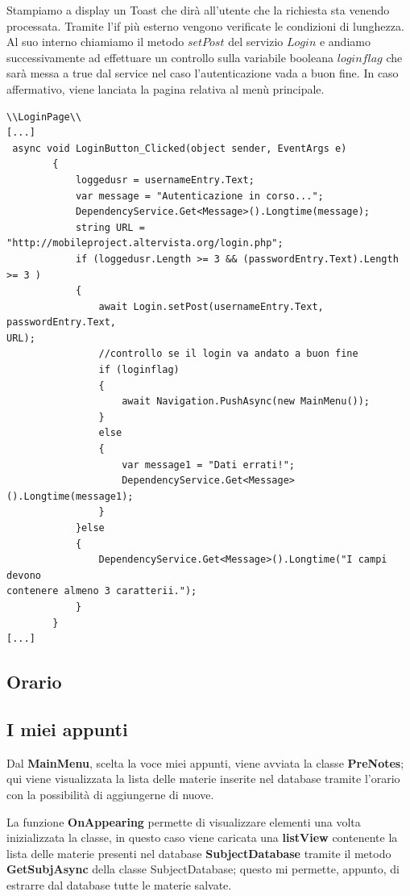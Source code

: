 \documentclass[a4paper, 50pt, twoside]{article}
\begin{document}
Stampiamo a display un Toast che dirà all'utente che la richiesta sta venendo processata. Tramite l'if più esterno vengono verificate le condizioni di lunghezza. Al suo interno chiamiamo il metodo $setPost$ del servizio $Login$ e andiamo successivamente ad effettuare un controllo sulla variabile booleana $loginflag$ che sarà messa a true dal service nel caso l'autenticazione vada a buon fine. In caso affermativo, viene lanciata la pagina relativa al menù principale.
\begin{lstlisting}
\\LoginPage\\
[...]
 async void LoginButton_Clicked(object sender, EventArgs e)
        {
            loggedusr = usernameEntry.Text;
            var message = "Autenticazione in corso...";
            DependencyService.Get<Message>().Longtime(message);
            string URL = "http://mobileproject.altervista.org/login.php";
            if (loggedusr.Length >= 3 && (passwordEntry.Text).Length >= 3 )
            {
                await Login.setPost(usernameEntry.Text, passwordEntry.Text, 
URL);
                //controllo se il login va andato a buon fine
                if (loginflag)
                {
                    await Navigation.PushAsync(new MainMenu());
                }
                else
                {
                    var message1 = "Dati errati!";
                    DependencyService.Get<Message>().Longtime(message1);
                }
            }else
            {
                DependencyService.Get<Message>().Longtime("I campi devono 
contenere almeno 3 caratterii.");
            }
        }
[...]
\end{lstlisting}
\subsection{Orario}
\subsection{I miei appunti}
Dal \textbf{MainMenu}, scelta la voce miei appunti, viene avviata la classe \textbf{PreNotes}; qui viene visualizzata la lista delle materie inserite nel database tramite l'orario con la possibilità di aggiungerne di nuove.

La funzione \textbf{OnAppearing} permette di visualizzare elementi una volta inizializzata la classe, in questo caso viene caricata una \textbf{listView} contenente la lista delle materie presenti nel database \textbf{SubjectDatabase} tramite il metodo \textbf{GetSubjAsync} della classe SubjectDatabase; questo mi permette, appunto, di estrarre dal database tutte le materie salvate.
\end{document}
